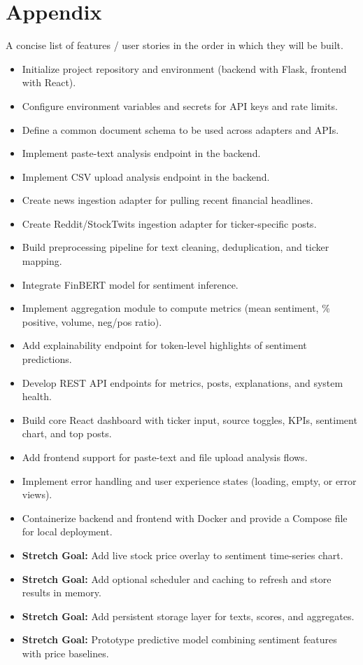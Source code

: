 \documentclass[12pt]{article}
\begin{document}
\newpage
\section*{Appendix}
A concise list of features / user stories in the order in which they will be built.

\begin{itemize}
    \item Initialize project repository and environment (backend with Flask, frontend with React).
    \item Configure environment variables and secrets for API keys and rate limits.
    \item Define a common document schema to be used across adapters and APIs.
    \item Implement paste-text analysis endpoint in the backend.
    \item Implement CSV upload analysis endpoint in the backend.
    \item Create news ingestion adapter for pulling recent financial headlines.
    \item Create Reddit/StockTwits ingestion adapter for ticker-specific posts.
    \item Build preprocessing pipeline for text cleaning, deduplication, and ticker mapping.
    \item Integrate FinBERT model for sentiment inference.
    \item Implement aggregation module to compute metrics (mean sentiment, \% positive, volume, neg/pos ratio).
    \item Add explainability endpoint for token-level highlights of sentiment predictions.
    \item Develop REST API endpoints for metrics, posts, explanations, and system health.
    \item Build core React dashboard with ticker input, source toggles, KPIs, sentiment chart, and top posts.
    \item Add frontend support for paste-text and file upload analysis flows.
    \item Implement error handling and user experience states (loading, empty, or error views).
    \item Containerize backend and frontend with Docker and provide a Compose file for local deployment.
    \item \textbf{Stretch Goal:} Add live stock price overlay to sentiment time-series chart.
    \item \textbf{Stretch Goal:} Add optional scheduler and caching to refresh and store results in memory.
    \item \textbf{Stretch Goal:} Add persistent storage layer for texts, scores, and aggregates.
    \item \textbf{Stretch Goal:} Prototype predictive model combining sentiment features with price baselines.
\end{itemize}




\end{document}
